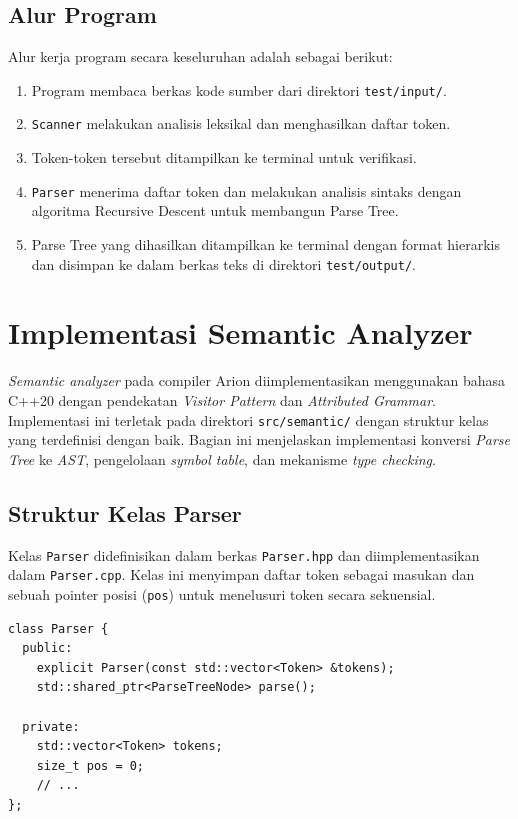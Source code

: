 ﻿\documentclass[12pt,a4paper]{article}
\begin{document}
\subsection{Alur Program}

Alur kerja program secara keseluruhan adalah sebagai berikut:
\begin{enumerate}
    \item Program membaca berkas kode sumber dari direktori \texttt{test/input/}.
    \item \texttt{Scanner} melakukan analisis leksikal dan menghasilkan daftar token.
    \item Token-token tersebut ditampilkan ke terminal untuk verifikasi.
    \item \texttt{Parser} menerima daftar token dan melakukan analisis sintaks dengan algoritma Recursive Descent untuk membangun Parse Tree.
    \item Parse Tree yang dihasilkan ditampilkan ke terminal dengan format hierarkis dan disimpan ke dalam berkas teks di direktori \texttt{test/output/}.
\end{enumerate}

\section{Implementasi Semantic Analyzer}

\textit{Semantic analyzer} pada compiler Arion diimplementasikan menggunakan bahasa C++20 dengan pendekatan \textit{Visitor Pattern} dan \textit{Attributed Grammar}. Implementasi ini terletak pada direktori \texttt{src/semantic/} dengan struktur kelas yang terdefinisi dengan baik. Bagian ini menjelaskan implementasi konversi \textit{Parse Tree} ke \textit{AST}, pengelolaan \textit{symbol table}, dan mekanisme \textit{type checking}.

\subsection{Struktur Kelas Parser}

Kelas \texttt{Parser} didefinisikan dalam berkas \texttt{Parser.hpp} dan diimplementasikan dalam \texttt{Parser.cpp}. Kelas ini menyimpan daftar token sebagai masukan dan sebuah pointer posisi (\texttt{pos}) untuk menelusuri token secara sekuensial.

\begin{lstlisting}[style=cpp, caption={Deklarasi kelas Parser}]
class Parser {
  public:
    explicit Parser(const std::vector<Token> &tokens);
    std::shared_ptr<ParseTreeNode> parse();

  private:
    std::vector<Token> tokens;
    size_t pos = 0;
    // ...
};
\end{lstlisting}
\end{document}
